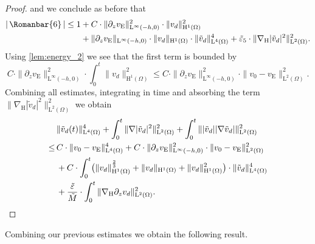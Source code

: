 \documentclass[preprint]{elsarticle}
\numberwithin{equation}{section}
\renewcommand{\H}{\mathrm{H}}
\newcommand{\dk}[1]{\partial_{#1}}
\newcommand{\dz}{\dk{z}}
\newcommand{\vtilde}{\tilde{v}}
\newcommand{\nablaH}{\nabla_{\H}}
\newcommand{\rL}{\mathrm{L}}
\newcommand{\rH}{\H}
\newcommand{\rE}{\mathrm{E}}
\newcommand{\VI}{\, \Romanbar{6}\, }
\begin{document}
\begin{proof}
	and we conclude as before that
	\begin{align*}
		| \VI |
		\leq 1 &+ C \cdot 
		\| \dz v_{\rE} \|_{\rL^\infty(-h,0)}^2 \cdot \| v_d \|_{\rH^1(\Omega)}^2 \\
		&+ \| \dz v_{\rE} \|_{\rL^\infty(-h,0)} \cdot \| v_d \|_{\rH^1(\Omega)} \cdot \| \vtilde_d \|_{\rL^4(\Omega)}^4
		+ \tilde{\varepsilon}_5 \cdot 
		\| \nablaH |\vtilde_d|^2 \|_{\rL^2(\Omega)}^2 .
	\end{align*}
	Using \autoref{lem:energy_2} we see that the first term is bounded by
	\begin{equation*}
		C \cdot
		\| \dz v_{\rE} \|_{\rL^\infty(-h,0)}^2 \cdot \int_0^t \| v_d \|_{\rH^1(\Omega)}^2
		\leq C \cdot 
		\| \dz v_{\rE} \|_{\rL^\infty(-h,0)}^2 \cdot \| v_0 - v_{\rE} \|_{\rL^2(\Omega)}^2 .
	\end{equation*}
	Combining all estimates, integrating in time and absorbing the term \\ $\| \nablaH |\vtilde_d|^2 \|_{\rL^2(\Omega)}^2$ we obtain
	\begin{align*}
		&\| \vtilde_d(t) \|_{\rL^4(\Omega)}^4 
		+ \int_0^t \| \nabla |\vtilde_d|^2 \|_{\rL^2(\Omega)}^2
		+ \int_0^t \| |\vtilde_d| |\nabla \vtilde_d| \|_{\rL^2(\Omega)}^2 \\
		\leq \, & C \cdot \| v_0-v_{\rE} \|_{\rL^4(\Omega)}^4
		+ C \cdot 
		\| \dz v_{\rE} \|_{\rL^\infty(-h,0)}^2 \cdot \| v_0 - v_{\rE} \|_{\rL^2(\Omega)}^2 \\
		&+ C \cdot \int_0^t \bigl( \| v_d \|_{\rH^1(\Omega)}^{\frac{2}{3}} + \| v_d \|_{\rH^1(\Omega)}+\| v_d \|_{\rH^1(\Omega)}^2 \bigr) 
		\cdot \| \vtilde_d \|_{\rL^4(\Omega)}^4  \\
		&+ \frac{\tilde{\varepsilon}}{\tilde{M}} \cdot \int_0^t \| \nablaH \partial_z v_d \|_{\rL^2(\Omega)}^2 . \qedhere 
	\end{align*} 
\end{proof}

Combining our previous estimates we obtain the following result. 
\end{document}
